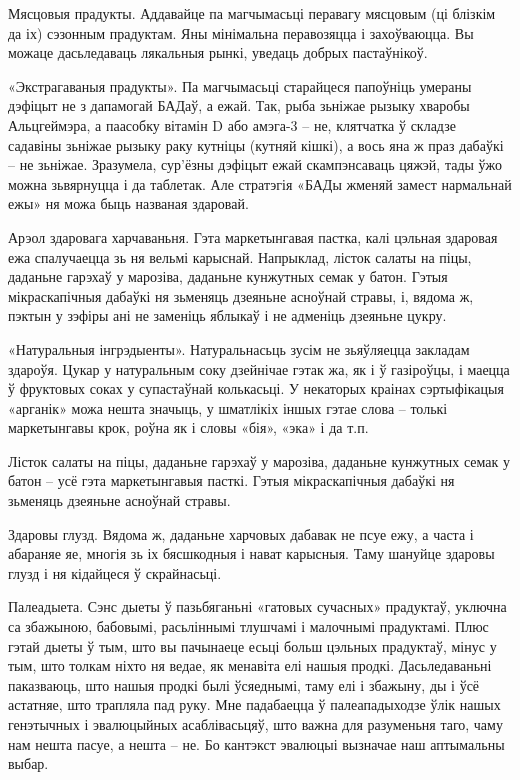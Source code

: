 Мясцовыя прадукты.
Аддавайце па магчымасьці перавагу мясцовым (ці блізкім да іх) сэзонным прадуктам. Яны мінімальна перавозяцца і захоўваюцца. Вы можаце дасьледаваць лякальныя рынкі, уведаць добрых пастаўнікоў.

«Экстрагаваныя прадукты».
Па магчымасьці старайцеся папоўніць умераны дэфіцыт не з дапамогай БАДаў, а ежай. Так, рыба зьніжае рызыку хваробы Альцгеймэра, а паасобку вітамін D або амэга-3 – не, клятчатка ў складзе садавіны зьніжае рызыку раку кутніцы (кутняй кішкі), а вось яна ж праз дабаўкі – не зьніжае. Зразумела, сур'ёзны дэфіцыт ежай скампэнсаваць цяжэй, тады ўжо можна зьвярнуцца і да таблетак. Але стратэгія «БАДы жменяй замест нармальнай ежы» ня можа быць названая здаровай.

Арэол здаровага харчаваньня.
Гэта маркетынгавая пастка, калі цэльная здаровая ежа спалучаецца зь ня вельмі карыснай. Напрыклад, лісток салаты на піцы, даданьне гарэхаў у марозіва, даданьне кунжутных семак у батон. Гэтыя мікраскапічныя дабаўкі ня зьменяць дзеяньне асноўнай стравы, і, вядома ж, пэктын у зэфіры ані не заменіць яблыкаў і не адменіць дзеяньне цукру.

«Натуральныя інгрэдыенты».
Натуральнасьць зусім не зьяўляецца закладам здароўя. Цукар у натуральным соку дзейнічае гэтак жа, як і ў газіроўцы, і маецца ў фруктовых соках у супастаўнай колькасьці. У некаторых краінах сэртыфікацыя «арганік» можа нешта значыць, у шматлікіх іншых гэтае слова – толькі маркетынгавы крок, роўна як і словы «бія», «эка» і да т.п.

Лісток салаты на піцы, даданьне гарэхаў у марозіва, даданьне кунжутных семак у батон – усё гэта маркетынгавыя пасткі. Гэтыя мікраскапічныя дабаўкі ня зьменяць дзеяньне асноўнай стравы.

Здаровы глузд.
Вядома ж, даданьне харчовых дабавак не псуе ежу, а часта і абараняе яе, многія зь іх бясшкодныя і нават карысныя. Таму шануйце здаровы глузд і ня кідайцеся ў скрайнасьці.

Палеадыета.
Сэнс дыеты ў пазьбяганьні «гатовых сучасных» прадуктаў, уключна са збажыною, бабовымі, расьліннымі тлушчамі і малочнымі прадуктамі. Плюс гэтай дыеты ў тым, што вы пачынаеце есьці больш цэльных прадуктаў, мінус у тым, што толкам ніхто ня ведае, як менавіта елі нашыя продкі. Дасьледаваньні паказваюць, што нашыя продкі былі ўсяеднымі, таму елі і збажыну, ды і ўсё астатняе, што трапляла пад руку. Мне падабаецца ў палеападыходзе ўлік нашых генэтычных і эвалюцыйных асаблівасьцяў, што важна для разуменьня таго, чаму нам нешта пасуе, а нешта – не. Бо кантэкст эвалюцыі вызначае наш аптымальны выбар.
